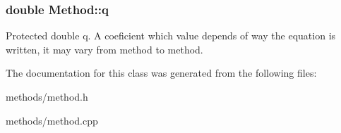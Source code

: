 \subsubsection[{\texorpdfstring{q}{q}}]{\setlength{\rightskip}{0pt plus 5cm}double Method\+::q\hspace{0.3cm}{\ttfamily [protected]}}\hypertarget{classMethod_a794257d62bedf3691c3c0a2b921b8886}{}\label{classMethod_a794257d62bedf3691c3c0a2b921b8886}
Protected double q. A coeficient which value depends of way the equation is written, it may vary from method to method. 

The documentation for this class was generated from the following files\+:\begin{DoxyCompactItemize}
\item 
methods/method.\+h\item 
methods/method.\+cpp\end{DoxyCompactItemize}
